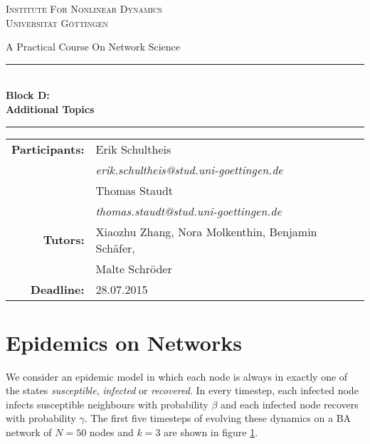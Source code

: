 \documentclass{scrartcl}
\begin{document}
\begin{titlepage}\centering
\textsc{\Large Institute For Nonlinear Dynamics \\[1.5ex] Universität Göttingen}

\vspace*{2cm}
{\huge A Practical Course On Network Science}
\vspace*{2cm}

\rule{\textwidth}{1pt}\\[0.5cm]
{\bfseries \huge Block D: \\[0.5cm] \huge \bfseries Additional Topics\\[0.5cm]}
\rule{\textwidth}{1pt}

\vspace*{4cm}

\begin{Large}\begin{tabular}{rl}
        \textbf{Participants:}  & Erik Schultheis                                \\    
                   & \textit{erik.schultheis@stud.uni-goettingen.de}\\[0.5cm]
                   & Thomas Staudt                                  \\
                   & \textit{thomas.staudt@stud.uni-goettingen.de}  \\[1.0cm]

       \textbf{Tutors:}        & Xiaozhu Zhang, Nora Molkenthin, Benjamin Schäfer, \\
                               & Malte Schröder                                    \\[1.0cm]
       \textbf{Deadline:}      & 28.07.2015
\end{tabular}\end{Large}

\vspace*{1.5cm}


\end{titlepage}

\tableofcontents
\clearpage

\section{Epidemics on Networks}
We consider an epidemic model in which each node is always in exactly one of the states \emph{susceptible}, \emph{infected} or \emph{recovered}. 
In every timestep, each infected node infects susceptible neighbours with probability $\beta$ and each infected node recovers with probability $\gamma$. 
The first five timesteps of evolving these dynamics on a BA network of $N=50$ nodes and $k=3$ are shown in figure \ref{}.
\end{document}
